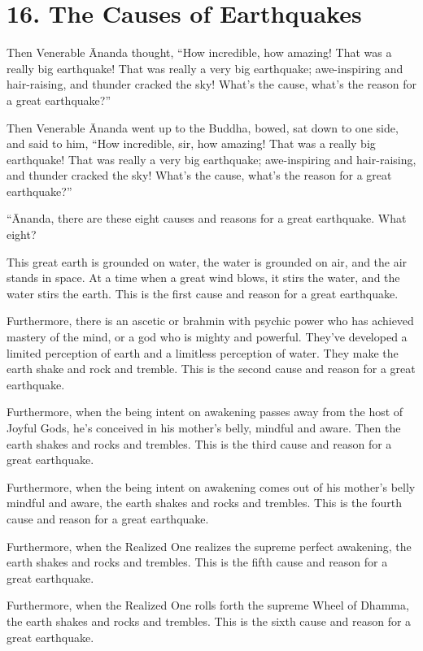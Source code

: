 \documentclass[12pt,openany]{book}%
\begin{document}
\section*{16. The Causes of Earthquakes }

Then Venerable Ānanda thought, “How incredible, how amazing! That was a really big earthquake! That was really a very big earthquake; awe-inspiring and hair-raising, and thunder cracked the sky! What’s the cause, what’s the reason for a great earthquake?” 

Then Venerable Ānanda went up to the Buddha, bowed, sat down to one side, and said to him, “How incredible, sir, how amazing! That was a really big earthquake! That was really a very big earthquake; awe-inspiring and hair-raising, and thunder cracked the sky! What’s the cause, what’s the reason for a great earthquake?” 

“Ānanda, there are these eight causes and reasons for a great earthquake. What eight? 

This great earth is grounded on water, the water is grounded on air, and the air stands in space. At a time when a great wind blows, it stirs the water, and the water stirs the earth. This is the first cause and reason for a great earthquake. 

Furthermore, there is an ascetic or brahmin with psychic power who has achieved mastery of the mind, or a god who is mighty and powerful. They’ve developed a limited perception of earth and a limitless perception of water. They make the earth shake and rock and tremble. This is the second cause and reason for a great earthquake. 

Furthermore, when the being intent on awakening passes away from the host of Joyful Gods, he’s conceived in his mother’s belly, mindful and aware. Then the earth shakes and rocks and trembles. This is the third cause and reason for a great earthquake. 

Furthermore, when the being intent on awakening comes out of his mother’s belly mindful and aware, the earth shakes and rocks and trembles. This is the fourth cause and reason for a great earthquake. 

Furthermore, when the Realized One realizes the supreme perfect awakening, the earth shakes and rocks and trembles. This is the fifth cause and reason for a great earthquake. 

Furthermore, when the Realized One rolls forth the supreme Wheel of Dhamma, the earth shakes and rocks and trembles. This is the sixth cause and reason for a great earthquake. 
\end{document}

